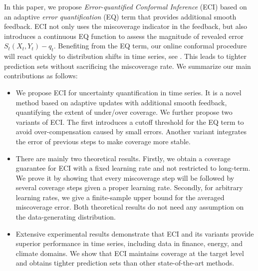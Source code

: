 In this paper, we propose \textit{Error-quantified Conformal Inference }(ECI) based on an adaptive \textit{error quantification} (EQ) term that provides additional smooth feedback. ECI not only uses the miscoverage indicator in the feedback, but also introduces a continuous EQ function to assess the magnitude of revealed error $S_t(X_t,Y_t) - q_t$. Benefiting from the EQ term, our online conformal procedure will react quickly to distribution shifts in time series, see . This leads to tighter prediction sets without sacrificing the miscoverage rate. 
We summarize our main contributions as follows:
\begin{itemize}
    \item We propose ECI for uncertainty quantification in time series. It is a novel method based on adaptive updates with additional smooth feedback, quantifying the extent of under/over coverage.
    We further propose two variants of ECI. The first introduces a cutoff threshold for the EQ term to avoid over-compensation caused by small errors. Another variant integrates the error of previous steps to make coverage more stable.
    
    \item There are mainly two theoretical results. Firstly, we obtain a coverage guarantee for ECI with a fixed learning rate and not restricted to long-term. We prove it by showing that every miscoverage step will be followed by several coverage steps given a proper learning rate. Secondly, for arbitrary learning rates, we give a finite-sample upper bound for the averaged miscoverage error. Both theoretical results do not need any assumption on the data-generating distribution.
    
    \item Extensive experimental results demonstrate that ECI and its variants provide superior performance in time series, including data in finance, energy, and climate domains. We show that ECI maintains coverage at the target level and obtains tighter prediction sets than other state-of-the-art methods.
\end{itemize}
